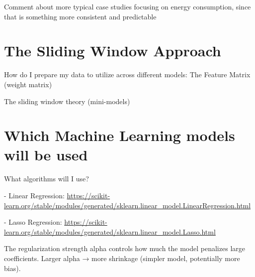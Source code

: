 \documentclass[12pt]{report} %
\begin{document}
Comment about more typical case studies focusing on energy consumption, since that is something more consistent and predictable

\section{The Sliding Window Approach}

How do I prepare my data to utilize across different models: The Feature Matrix (weight matrix)

The sliding window theory (mini-models)

\section{Which Machine Learning models will be used}
What algorithms will I use?

- Linear Regression: \url{https://scikit-learn.org/stable/modules/generated/sklearn.linear_model.LinearRegression.html}



- Lasso Regression: \url{https://scikit-learn.org/stable/modules/generated/sklearn.linear_model.Lasso.html}

The regularization strength alpha controls how much the model penalizes large coefficients. Larger alpha → more shrinkage (simpler model, potentially more bias).









\end{document}
